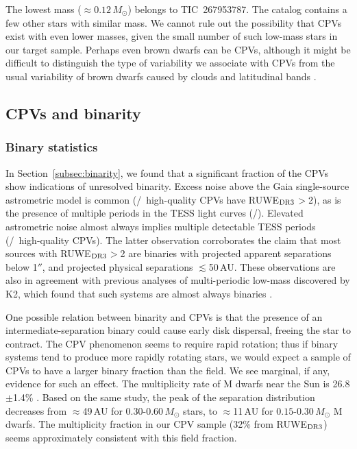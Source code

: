 \documentclass[11pt,twocolumn,tighten]{aastex63}
\begin{document}
The lowest mass ($\approx$$0.12$\,$M_\odot$) belongs to TIC~267953787.
The catalog contains a few other stars with similar mass.  We cannot
rule out the possibility that CPVs exist with even lower masses, given
the small number of such low-mass stars in our target sample.  Perhaps
even brown dwarfs can be CPVs, although it might be difficult to
distinguish the type of variability we associate with CPVs from the
usual variability of brown dwarfs caused by clouds and latitudinal
bands \citep[e.g.][]{2021ApJ...906...64A,2022ApJ...924...68V}.



\subsection{CPVs and binarity}
\label{subsec:discbinary}

\subsubsection{Binary statistics}

In Section~\ref{subsec:binarity}, we found that a significant fraction
of the CPVs show indications of unresolved binarity.  Excess noise
above the Gaia single-source astrometric model is common
(\ngoodhighruwe/\ngoods\ high-quality CPVs have RUWE$_{\rm DR3}$$>$2),
as is the presence of multiple periods in the TESS light curves
(\ngoodmultperiodflag/\ngoods).  Elevated astrometric noise almost
always implies multiple detectable TESS periods
(\ngoodruweandmultperiod/\ngoodhighruwe\ high-quality CPVs).  The
latter observation corroborates the claim that most sources with
RUWE$_{\rm DR3}$$>$2 are binaries with projected apparent separations
below 1$''$, and projected physical separations $\lesssim$50\,AU.
These observations are also in agreement with previous analyses of
multi-periodic low-mass discovered by K2, which found that such
systems are almost always binaries
\citep{2018AJ....156..138T,2018AJ....156..275S}.

One possible relation between binarity and CPVs is that the presence of
an intermediate-separation binary could cause early disk dispersal,
freeing the star to contract.  The CPV phenomenon seems to require
rapid rotation; thus if binary systems tend to produce more rapidly
rotating stars, we would expect a sample of CPVs to have a larger
binary fraction than the field.  We see marginal, if any, evidence for such
an effect.  The multiplicity rate of M dwarfs near the Sun is
26.8$\pm$1.4\% \citep{2019AJ....157..216W}.  Based on the same study,
the peak of the separation distribution decreases from $\approx$49\,AU
for $0.30$-$0.60$\,$M_\odot$ stars, to $\approx$11\,AU for
$0.15$-$0.30$\,$M_\odot$ M dwarfs.  The multiplicity fraction in our
CPV sample (32\% from RUWE$_{\rm DR3}$) seems approximately consistent
with this field fraction.
\end{document}
